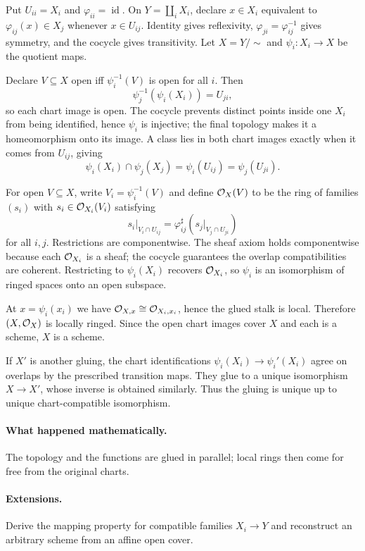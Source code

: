 \begin{solution}
Put $U_{ii}=X_i$ and $\varphi_{ii}=\operatorname{id}$.  On $Y=\coprod_iX_i$, declare $x\in X_i$ equivalent to $\varphi_{ij}(x)\in X_j$ whenever $x\in U_{ij}$.  Identity gives reflexivity, $\varphi_{ji}=\varphi_{ij}^{-1}$ gives symmetry, and the cocycle gives transitivity.  Let $X=Y/{\sim}$ and $\psi_i:X_i\to X$ be the quotient maps.

Declare $V\subseteq X$ open iff $\psi_i^{-1}(V)$ is open for all $i$.  Then
\[
\psi_j^{-1}(\psi_i(X_i))=U_{ji},
\]
so each chart image is open.  The cocycle prevents distinct points inside one $X_i$ from being identified, hence $\psi_i$ is injective; the final topology makes it a homeomorphism onto its image.  A class lies in both chart images exactly when it comes from $U_{ij}$, giving
\[
\psi_i(X_i)\cap\psi_j(X_j)=\psi_i(U_{ij})=\psi_j(U_{ji}).
\]

For open $V\subseteq X$, write $V_i=\psi_i^{-1}(V)$ and define $\mathcal O_X(V)$ to be the ring of families $(s_i)$ with $s_i\in\mathcal O_{X_i}(V_i)$ satisfying
\[
s_i|_{V_i\cap U_{ij}}=\varphi_{ij}^{\sharp}(s_j|_{V_j\cap U_{ji}})
\]
for all $i,j$.  Restrictions are componentwise.  The sheaf axiom holds componentwise because each $\mathcal O_{X_i}$ is a sheaf; the cocycle guarantees the overlap compatibilities are coherent.  Restricting to $\psi_i(X_i)$ recovers $\mathcal O_{X_i}$, so $\psi_i$ is an isomorphism of ringed spaces onto an open subspace.

At $x=\psi_i(x_i)$ we have $\mathcal O_{X,x}\cong\mathcal O_{X_i,x_i}$, hence the glued stalk is local.  Therefore $(X,\mathcal O_X)$ is locally ringed.  Since the open chart images cover $X$ and each is a scheme, $X$ is a scheme.

If $X'$ is another gluing, the chart identifications $\psi_i(X_i)\to\psi_i'(X_i)$ agree on overlaps by the prescribed transition maps.  They glue to a unique isomorphism $X\to X'$, whose inverse is obtained similarly.  Thus the gluing is unique up to unique chart-compatible isomorphism.
\end{solution}

\paragraph{What happened mathematically.}
The topology and the functions are glued in parallel; local rings then come for free from the original charts.

\paragraph{Extensions.}
Derive the mapping property for compatible families $X_i\to Y$ and reconstruct an arbitrary scheme from an affine open cover.
\fi
